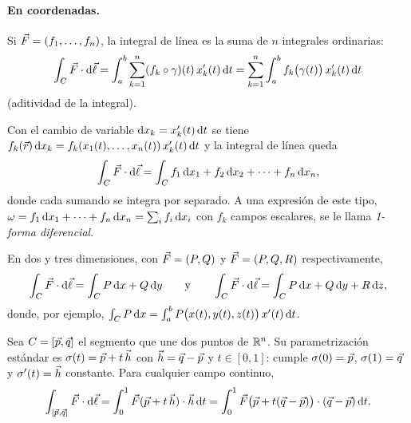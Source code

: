 \paragraph{En coordenadas.} Si $\vec{F}=(f_1,\ldots,f_n)$, la integral de línea es
la suma de $n$ integrales ordinarias:
\begin{equation}\label{eq:linea-coord}
  \int_{C}\vec{F}\cdot\mathrm{d}\vec{\ell}=\int_{a}^{b}\sum_{k=1}^{n}(f_k\circ\gamma)(t)\,x_k'(t)\,\mathrm{d} t
  =\sum_{k=1}^{n}\int_{a}^{b}f_k\bigl(\gamma(t)\bigr)\,x_k'(t)\,\mathrm{d} t
\end{equation}
(aditividad de la integral).

\begin{definicion}\label{def:diferencial-linea}
Con el cambio de variable $\mathrm{d} x_k=x_k'(t)\,\mathrm{d} t$ se tiene
$f_k(\vec{r})\,\mathrm{d} x_k=f_k(x_1(t),\ldots,x_n(t))\,x_k'(t)\,\mathrm{d} t$ y la integral de
línea queda
\[
  \int_{C}\vec{F}\cdot\mathrm{d}\vec{\ell}=\int_{C}f_1\,\mathrm{d} x_1+f_2\,\mathrm{d} x_2+\cdots+f_n\,\mathrm{d} x_n ,
\]
donde cada sumando se integra por separado. A una expresión de este tipo,
$\omega=f_1\,\mathrm{d} x_1+\cdots+f_n\,\mathrm{d} x_n=\sum_i f_i\,\mathrm{d} x_i$ con $f_k$
campos escalares, se le llama \emph{1-forma diferencial}.
\end{definicion}

En dos y tres dimensiones, con $\vec{F}=(P,Q)$ y $\vec{F}=(P,Q,R)$ respectivamente,
\begin{equation}\label{eq:linea-2d3d}
  \int_{C}\vec{F}\cdot\mathrm{d}\vec{\ell}=\int_{C}P\,\mathrm{d} x+Q\,\mathrm{d} y
  \qquad\text{y}\qquad
  \int_{C}\vec{F}\cdot\mathrm{d}\vec{\ell}=\int_{C}P\,\mathrm{d} x+Q\,\mathrm{d} y+R\,\mathrm{d} z,
\end{equation}
donde, por ejemplo, $\int_{C}P\,\mathrm{d} x=\int_a^bP\bigl(x(t),y(t),z(t)\bigr)\,x'(t)\,\mathrm{d} t$.

\begin{ejemplo}\label{ej:segmento}
Sea $C=[\vec{p},\vec{q}]$ el segmento que une dos puntos de $\mathbb{R}^{n}$. Su
parametrización estándar es $\sigma(t)=\vec{p}+t\,\vec{h}$ con
$\vec{h}=\vec{q}-\vec{p}$ y $t\in[0,1]$: cumple $\sigma(0)=\vec{p}$,
$\sigma(1)=\vec{q}$ y $\sigma'(t)=\vec{h}$ constante. Para cualquier campo
continuo,
\[
  \int_{[\vec{p},\vec{q}]}\vec{F}\cdot\mathrm{d}\vec{\ell}
  =\int_{0}^{1}\vec{F}(\vec{p}+t\,\vec{h})\cdot\vec{h}\,\mathrm{d} t
  =\int_{0}^{1}\vec{F}\bigl(\vec{p}+t(\vec{q}-\vec{p})\bigr)\cdot(\vec{q}-\vec{p})\,\mathrm{d} t .
\]
\end{ejemplo}


